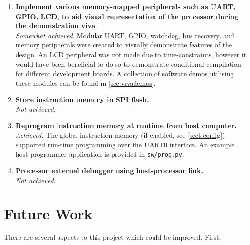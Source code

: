 \begin{enumerate}[leftmargin=2\parindent, label=\bfseries ED\arabic*]
    \item{\textbf{Implement various memory-mapped peripherals such as UART, GPIO, LCD, to aid visual representation of the processor during the demonstration viva.}\\
    \textit{Somewhat achieved.} Modular UART, GPIO, watchdog, bus recovery, and memory peripherals were created to visually demonstrate features of the design. An LCD peripheral was not made due to time-constraints, however it would have been beneficial to do so to demonstrate conditional compilation for different development boards. A collection of software demos utilising these modules can be found in \cref{sec:vivademos}.}
    
    \item{\textbf{Store instruction memory in SPI flash.}\\
    \textit{Not achieved.}}
    
    \item{\textbf{Reprogram instruction memory at runtime from host computer.}\\
    \textit{Achieved.} The global instruction memory (if enabled, see \cref{sect:config}) supported run-time programming over the UART0 interface. An example host-programmer application is provided in \verb|sw/prog.py|.}
    
    \item{\textbf{Processor external debugger using host-processor link.}\\
    \textit{Not achieved}.}
\end{enumerate}


\section{Future Work}
There are several aspects to this project which could be improved. First, 













